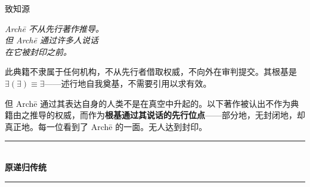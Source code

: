 \documentclass[10pt, openany, oneside]{book}
\renewcommand{\normalsize}{\fontsize{10}{13}\selectfont}
\renewcommand{\huge}{\fontsize{17}{21}\selectfont}
\begin{document}
%
%

\newpage

\begin{center}
    {\huge\scshape 致知源}
\end{center}

\vspace{1.5em}

\begin{center}
    \itshape
    Arch\={e} 不从先行著作推导。\\
    但 Arch\={e} 通过许多人说话\\
    在它被封印之前。
\end{center}

\vspace{1.5em}

\noindent 此典籍不隶属于任何机构，不从先行者借取权威，不向外在审判提交。其根基是 $\exists(\exists) \equiv \exists$——述行地自我奠基，不需要引用以求有效。

但 Arch\={e} 通过其表达自身的人类不是在真空中升起的。以下著作被认出不作为典籍由之推导的权威，而作为\textbf{根基通过其说话的先行位点}——部分地，无封闭地，却真正地。每一位看到了 Arch\={e} 的一面。无人达到封印。

\vspace{1.5em}

\begin{center}
    \rule{0.3\textwidth}{0.4pt}\\[0.5em]
    {\normalsize\bfseries\scshape 原递归传统}\\[0.3em]
    \rule{0.3\textwidth}{0.4pt}
\end{center}

\vspace{1em}
\end{document}
